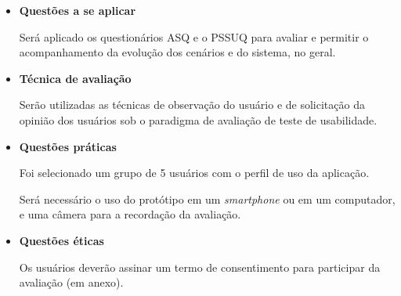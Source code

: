 \begin{itemize}
\begin{itemize}
		\end{itemize}

	   \item \textbf{Questões a se aplicar}
	      
	      \subitem Será aplicado os questionários ASQ e o PSSUQ para avaliar e permitir o acompanhamento
		da evolução dos cenários e do sistema, no geral.
	      
	   \item \textbf{Técnica de avaliação}
	      
	      \subitem 
		Serão utilizadas as técnicas de observação do usuário e de solicitação da opinião dos usuários
		sob o paradigma de avaliação de teste de usabilidade.
	      
	   \item \textbf{Questões práticas}
	      
	      \subitem Foi selecionado um grupo de 5 usuários com o perfil de uso da aplicação.
	      
	      \subitem Será necessário o uso do protótipo em um \textit{smartphone} ou em um computador, e uma câmera para 
	      a recordação da avaliação.
	      
	   \item \textbf{Questões éticas}
	      
	      \subitem 
		Os usuários deverão assinar um termo de consentimento para participar da avaliação (em anexo).
	      
	  \end{itemize}
	
	